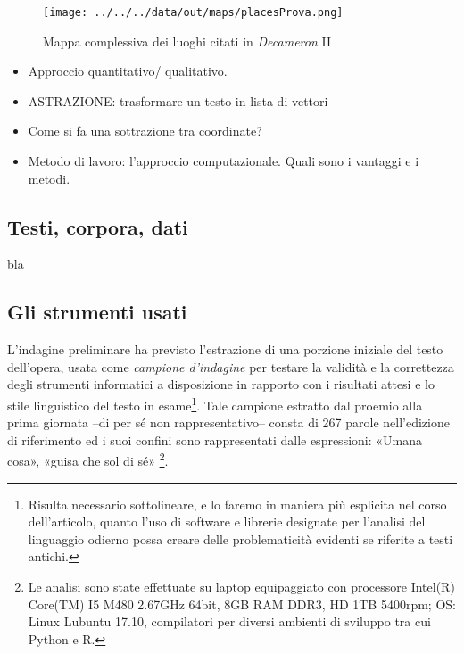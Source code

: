 \begin{figure}
\centering
\texttt{[image: ../../../data/out/maps/placesProva.png]}
\caption{Mappa complessiva dei luoghi citati in \emph{Decameron} II}
\end{figure}

\begin{itemize}
\tightlist
\item
  Approccio quantitativo/ qualitativo.
\item
  ASTRAZIONE: trasformare un testo in lista di vettori
\item
  Come si fa una sottrazione tra coordinate?
\item
  Metodo di lavoro: l'approccio computazionale. Quali sono i vantaggi e
  i metodi.
\end{itemize}

\subsection{Testi, corpora, dati}\label{testi-corpora-dati}

\autocite{owens2011}

bla

\autocite{moretti2005}

\subsection{Gli strumenti usati}\label{gli-strumenti-usati}

L'indagine preliminare ha previsto l'estrazione di una porzione iniziale
del testo dell'opera, usata come \emph{campione d'indagine} per testare
la validità e la correttezza degli strumenti informatici a disposizione
in rapporto con i risultati attesi e lo stile linguistico del testo in
esame\footnote{Risulta necessario sottolineare, e lo faremo in maniera
  più esplicita nel corso dell'articolo, quanto l'uso di software e
  librerie designate per l'analisi del linguaggio odierno possa creare
  delle problematicità evidenti se riferite a testi antichi.}. Tale
campione estratto dal proemio alla prima giornata --di per sé non
rappresentativo-- consta di 267 parole nell'edizione di riferimento ed i
suoi confini sono rappresentati dalle espressioni: «Umana cosa», «guisa
che sol di sé» \footnote{Le analisi sono state effettuate su laptop
  equipaggiato con processore Intel(R) Core(TM) I5 M480 2.67GHz 64bit,
  8GB RAM DDR3, HD 1TB 5400rpm; OS: Linux Lubuntu 17.10, compilatori per
  diversi ambienti di sviluppo tra cui Python e R.}.

